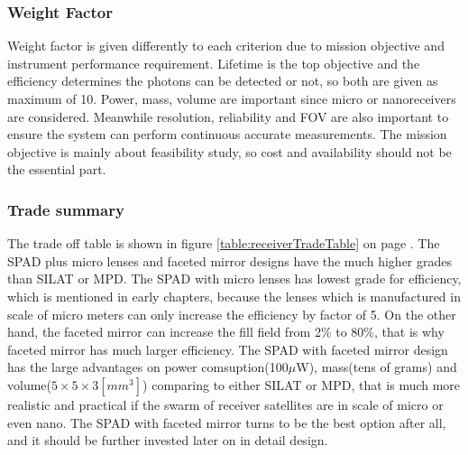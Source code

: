 \subsubsection{Weight Factor}
\label{TOReceiverWF}
Weight factor is given differently to each criterion due to mission objective and instrument performance requirement. Lifetime is the top objective and the efficiency determines the photons can be detected or not, so both are given as maximum of 10. Power, mass, volume are important since micro or nanoreceivers are considered. Meanwhile resolution, reliability and \acs{FOV} are also important to ensure the system can perform continuous accurate measurements. The mission objective is mainly about feasibility study, so cost and availability should not be the essential part.

\subsubsection{Trade summary}
\label{TOReceiverS}
The trade off table is shown in figure \ref{table:receiverTradeTable} on page \pageref{table:receiverTradeTable}. The \acs{SPAD} plus micro lenses and faceted mirror designs have the much higher grades than \acs{SILAT} or \acs{MPD}. The \acs{SPAD} with micro lenses has lowest grade for efficiency, which is mentioned in early chapters, because the lenses which is manufactured in scale of micro meters can only increase the efficiency by factor of 5. On the other hand, the faceted mirror can increase the fill field from 2\% to 80\%, that is why faceted mirror has much larger efficiency. The \acs{SPAD} with faceted mirror design has the large advantages on power comsuption(100$\mu$W), mass(tens of grams) and volume($5\times5\times3[mm^{3}]$) comparing to either \acs{SILAT} or \acs{MPD}, that is much more realistic and practical if the swarm of receiver satellites are in scale of micro or even nano. The \acs{SPAD} with faceted mirror turns to be the best option after all, and it should be further invested later on in detail design.

